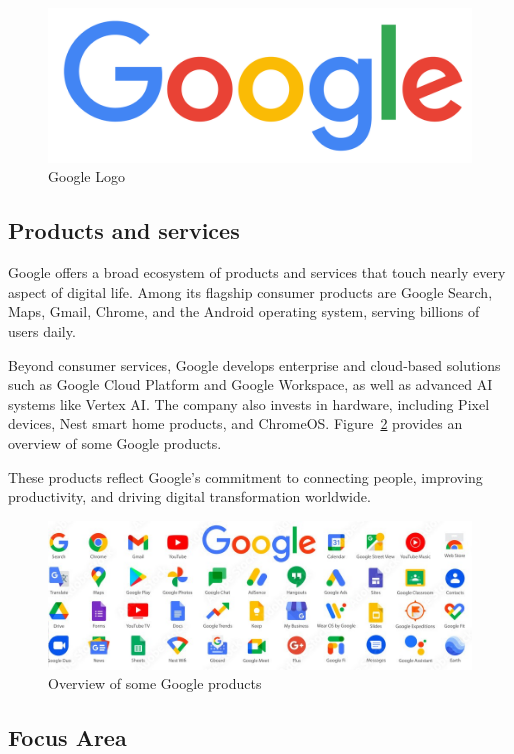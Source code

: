 \begin{spacing}{1.2}
\begin{figure}[!ht]\centering
\includegraphics[scale=0.06]{Images/google_logo.png}
\caption{Google Logo}
\label{fig:google_logo}
\end{figure}

\subsection{Products and services} 
Google offers a broad ecosystem of products and services that touch nearly every aspect of digital life. Among its flagship consumer products are Google Search, Maps, Gmail, Chrome, and the Android operating system, serving billions of users daily.

Beyond consumer services, Google develops enterprise and cloud-based solutions such as Google Cloud Platform and Google Workspace, as well as advanced AI systems like Vertex AI. The company also invests in hardware, including Pixel devices, Nest smart home products, and ChromeOS. Figure~\ref{fig:google_products} provides an overview of some Google products.

These products reflect Google's commitment to connecting people, improving productivity, and driving digital transformation worldwide.

\begin{figure}[!ht]\centering
\includegraphics[scale=1.3]{Images/google_products.jpg}
\caption{Overview of some Google products}
\label{fig:google_products}
\end{figure}

\subsection{Focus Area} 

\end{spacing}
